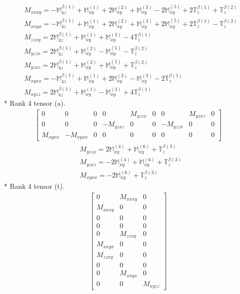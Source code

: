 \documentclass[fleqn,8pt,landscape]{jsarticle}
\begin{document}
\begin{align*}
& M_{xxxy} = - \mathbb{M}_{4z}^{\beta(1)} + \mathbb{M}_{xy}^{(1)} + 2 \mathbb{M}_{xy}^{(2)} + \mathbb{M}_{xy}^{(3)} - 2 \mathbb{M}_{xy}^{(5)} + 2 \mathbb{T}_{z}^{\beta(1)} + \mathbb{T}_{z}^{\beta(2)} \\
& M_{xxyx} = - \mathbb{M}_{4z}^{\beta(1)} + \mathbb{M}_{xy}^{(1)} + 2 \mathbb{M}_{xy}^{(2)} + \mathbb{M}_{xy}^{(3)} + 2 \mathbb{M}_{xy}^{(5)} + 2 \mathbb{T}_{z}^{\beta(1)} - \mathbb{T}_{z}^{\beta(2)} \\
& M_{zzxy} = 2 \mathbb{M}_{4z}^{\beta(1)} + \mathbb{M}_{xy}^{(1)} + \mathbb{M}_{xy}^{(3)} - 4 \mathbb{T}_{z}^{\beta(1)} \\
& M_{yzzx} = 2 \mathbb{M}_{4z}^{\beta(1)} + \mathbb{M}_{xy}^{(2)} - \mathbb{M}_{xy}^{(5)} - \mathbb{T}_{z}^{\beta(2)} \\
& M_{yzxz} = 2 \mathbb{M}_{4z}^{\beta(1)} + \mathbb{M}_{xy}^{(2)} + \mathbb{M}_{xy}^{(5)} + \mathbb{T}_{z}^{\beta(2)} \\
& M_{xyxx} = - \mathbb{M}_{4z}^{\beta(1)} + \mathbb{M}_{xy}^{(1)} + 2 \mathbb{M}_{xy}^{(2)} - \mathbb{M}_{xy}^{(3)} - 2 \mathbb{T}_{z}^{\beta(1)} \\
& M_{xyzz} = 2 \mathbb{M}_{4z}^{\beta(1)} + \mathbb{M}_{xy}^{(1)} - \mathbb{M}_{xy}^{(3)} + 4 \mathbb{T}_{z}^{\beta(1)}
\end{align*}
* Rank 4 tensor (a).
\begin{align*}
\begin{bmatrix} 0 & 0 & 0 & 0 & M_{yzzx} & 0 & 0 & M_{yzxz} & 0 \\ 0 & 0 & 0 & - M_{yzxz} & 0 & 0 & - M_{yzzx} & 0 & 0 \\ M_{xyxx} & - M_{xyxx} & 0 & 0 & 0 & 0 & 0 & 0 & 0 \end{bmatrix}
\end{align*}
\begin{align*}
& M_{yzzx} = 2 \mathbb{M}_{xy}^{(4)} + \mathbb{M}_{xy}^{(6)} + \mathbb{T}_{z}^{\beta(3)} \\
& M_{yzxz} = - 2 \mathbb{M}_{xy}^{(4)} + \mathbb{M}_{xy}^{(6)} + \mathbb{T}_{z}^{\beta(3)} \\
& M_{xyxx} = - 2 \mathbb{M}_{xy}^{(6)} + \mathbb{T}_{z}^{\beta(3)}
\end{align*}
* Rank 4 tensor (t).
\begin{align*}
\begin{bmatrix} 0 & M_{xxxy} & 0 \\ M_{xxxy} & 0 & 0 \\ 0 & 0 & 0 \\ 0 & 0 & 0 \\ 0 & M_{zzxy} & 0 \\ M_{xxyx} & 0 & 0 \\ M_{zzxy} & 0 & 0 \\ 0 & 0 & 0 \\ 0 & M_{xxyx} & 0 \\ 0 & 0 & M_{xyzz} \end{bmatrix}
\end{align*}
\end{document}
